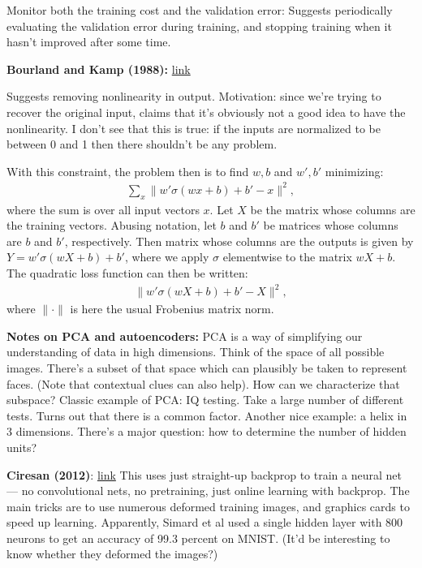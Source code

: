\documentclass[12pt]{article}
\newcommand{\link}[2]{\href{#1}{#2}}
\begin{document}
Monitor both the training cost and the validation error: Suggests
periodically evaluating the validation error during training, and
stopping training when it hasn't improved after some time.

\textbf{Bourland and Kamp (1988):}
\link{http://scholar.google.com/scholar?cluster=17784424506773259343\&hl=en\&as\_sdt=0,5}{link}

Suggests removing nonlinearity in output.  Motivation: since we're
trying to recover the original input, claims that it's obviously not a
good idea to have the nonlinearity.  I don't see that this is true: if
the inputs are normalized to be between 0 and 1 then there shouldn't
be any problem.

With this constraint, the problem then is to find $w, b$ and $w', b'$
minimizing:
\begin{eqnarray}
  \sum_x \|w' \sigma(wx+b)+b'-x\|^2,
\end{eqnarray}
where the sum is over all input vectors $x$.  Let $X$ be the matrix
whose columns are the training vectors.  Abusing notation, let $b$ and
$b'$ be matrices whose columns are $b$ and $b'$, respectively.  Then
matrix whose columns are the outputs is given by $Y =
w'\sigma(wX+b)+b'$, where we apply $\sigma$ elementwise to the
matrix $wX+b$.  The quadratic loss function can then be written:
\begin{eqnarray}
  \| w'\sigma(wX+b)+b'-X\|^2,
\end{eqnarray}
where $\|\cdot\|$ is here the usual Frobenius matrix norm.

\textbf{Notes on PCA and autoencoders:} PCA is a way of simplifying
our understanding of data in high dimensions.  Think of the space of
all possible images.  There's a subset of that space which can
plausibly be taken to represent faces.  (Note that contextual clues
can also help).  How can we characterize that subspace?  Classic
example of PCA: IQ testing.  Take a large number of different tests.
Turns out that there is a common factor.  Another nice example: a
helix in 3 dimensions.  There's a major question: how to determine the
number of hidden units?

\textbf{Ciresan (2012)}: \link{http://arxiv.org/abs/1003.0358}{link}
This uses just straight-up backprop to train a neural net --- no
convolutional nets, no pretraining, just online learning with
backprop.  The main tricks are to use numerous deformed training
images, and graphics cards to speed up learning.  Apparently, Simard
et al used a single hidden layer with 800 neurons to get an accuracy
of 99.3 percent on MNIST.  (It'd be interesting to know whether they
deformed the images?)
\end{document}
